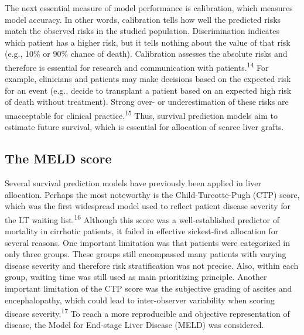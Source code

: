 \documentclass[11pt,english,]{book} %
\begin{document}
The next essential measure of model performance is calibration, which measures model accuracy. In other words, calibration tells how well the predicted risks match the observed risks in the studied population. Discrimination indicates which patient has a higher risk, but it tells nothing about the value of that risk (e.g., 10\% or 90\% chance of death). Calibration assesses the absolute risks and therefore is essential for research and communication with patients.\textsuperscript{14} For example, clinicians and patients may make decisions based on the expected risk for an event (e.g., decide to transplant a patient based on an expected high risk of death without treatment). Strong over- or underestimation of these risks are unacceptable for clinical practice.\textsuperscript{15} Thus, survival prediction models aim to estimate future survival, which is essential for allocation of scarce liver grafts.

\hypertarget{the-meld-score}{%
\subsection*{The MELD score}\label{the-meld-score}}

Several survival prediction models have previously been applied in liver allocation. Perhaps the most noteworthy is the Child-Turcotte-Pugh (CTP) score, which was the first widespread model used to reflect patient disease severity for the LT waiting list.\textsuperscript{16} Although this score was a well-established predictor of mortality in cirrhotic patients, it failed in effective sickest-first allocation for several reasons. One important limitation was that patients were categorized in only three groups. These groups still encompassed many patients with varying disease severity and therefore risk stratification was not precise. Also, within each group, waiting time was still used as main prioritizing principle. Another important limitation of the CTP score was the subjective grading of ascites and encephalopathy, which could lead to inter-observer variability when scoring disease severity.\textsuperscript{17} To reach a more reproducible and objective representation of disease, the Model for End-stage Liver Disease (MELD) was considered.
\end{document}
